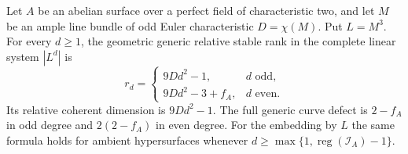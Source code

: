 \begin{theorem}
\label{thm:DE-A3-separable-ranks}
Let $A$ be an abelian surface over a perfect field of characteristic
two, and let $M$ be an ample line bundle of odd Euler characteristic
$D=\chi(M)$.  Put $L=M^3$.  For every $d\ge1$, the geometric generic
relative stable rank in the complete linear system $|L^d|$ is
\[
 r_d=\begin{cases}
           9Dd^2-1,&d\text{ odd},\\
           9Dd^2-3+f_A,&d\text{ even}.
       \end{cases}
\]
Its relative coherent dimension is $9Dd^2-1$.  The full generic
curve defect is $2-f_A$ in odd degree and $2(2-f_A)$ in even degree.
For the embedding by $L$ the same formula holds for ambient
hypersurfaces whenever
$d\ge\max\{1,\operatorname{reg}(\mathcal I_A)-1\}$.
\end{theorem}
